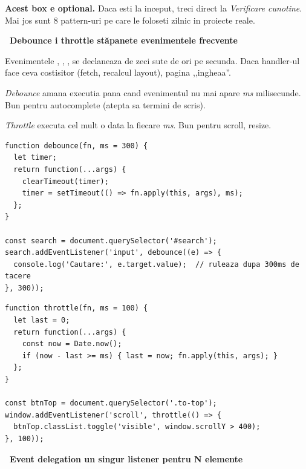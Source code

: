 \begin{bonusbox}
\textbf{Acest box e optional.} Daca esti la inceput, treci direct la \emph{Verificare cunotine}. Mai jos sunt 8 pattern-uri pe care le foloseti zilnic in proiecte reale.

\medskip

\textbf{\faClock\ Debounce i throttle \textendash{} st\u apanete evenimentele frecvente}

Evenimentele , , ,  se declaneaza de zeci \textendash{} sute de ori pe secunda. Daca handler-ul face ceva costisitor (fetch, recalcul layout), pagina ,,ingheaa''.

\emph{Debounce} \textendash{} amana executia pana cand evenimentul nu mai apare \emph{ms} milisecunde. Bun pentru autocomplete (atepta sa termini de scris).

\emph{Throttle} \textendash{} executa cel mult o data la fiecare \emph{ms}. Bun pentru scroll, resize.

\begin{lstlisting}[style=js, caption={Utilitar reutilizabil}]
function debounce(fn, ms = 300) {
  let timer;
  return function(...args) {
    clearTimeout(timer);
    timer = setTimeout(() => fn.apply(this, args), ms);
  };
}

const search = document.querySelector('#search');
search.addEventListener('input', debounce((e) => {
  console.log('Cautare:', e.target.value);  // ruleaza dupa 300ms de tacere
}, 300));
\end{lstlisting}

\begin{lstlisting}[style=js, caption={Buton ,,scroll to top'' care apare dupa 400px}]
function throttle(fn, ms = 100) {
  let last = 0;
  return function(...args) {
    const now = Date.now();
    if (now - last >= ms) { last = now; fn.apply(this, args); }
  };
}

const btnTop = document.querySelector('.to-top');
window.addEventListener('scroll', throttle(() => {
  btnTop.classList.toggle('visible', window.scrollY > 400);
}, 100));
\end{lstlisting}

\medskip

\textbf{\faSitemap\ Event delegation \textendash{} un singur listener pentru N elemente}


\end{bonusbox}
